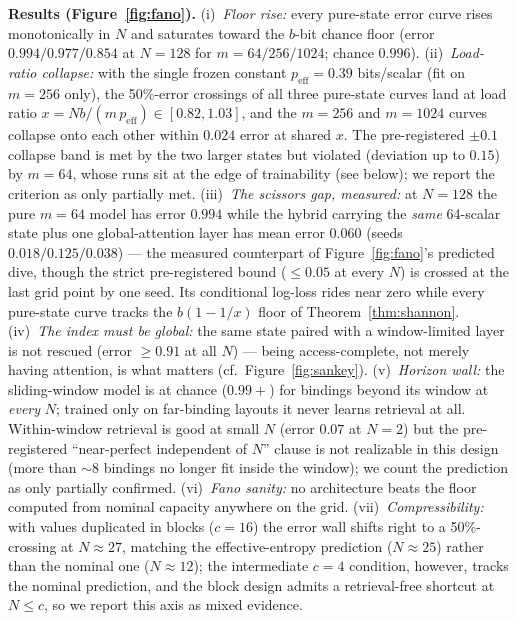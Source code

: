 \textbf{Results (Figure~\ref{fig:fano}).}
(i)~\emph{Floor rise:} every pure-state error curve rises monotonically in $N$
and saturates toward the $b$-bit chance floor (error $0.994/0.977/0.854$ at
$N{=}128$ for $m{=}64/256/1024$; chance $0.996$).
(ii)~\emph{Load-ratio collapse:} with the single frozen constant
$p_{\mathrm{eff}}{=}0.39$ bits/scalar (fit on $m{=}256$ only), the 50\%-error
crossings of all three pure-state curves land at load ratio
$x = Nb/(m\,p_{\mathrm{eff}}) \in [0.82, 1.03]$, and the $m{=}256$ and
$m{=}1024$ curves collapse onto each other within $0.024$ error at shared $x$.
The pre-registered $\pm 0.1$ collapse band is met by the two larger states but
violated (deviation up to $0.15$) by $m{=}64$, whose runs sit at the edge of
trainability (see below); we report the criterion as only partially met.
(iii)~\emph{The scissors gap, measured:} at $N{=}128$ the pure $m{=}64$ model
has error $0.994$ while the hybrid carrying the \emph{same} 64-scalar state
plus one global-attention layer has mean error $0.060$
(seeds $0.018/0.125/0.038$) --- the measured counterpart of
Figure~\ref{fig:fano}'s predicted dive, though the strict pre-registered bound
($\le 0.05$ at every $N$) is crossed at the last grid point by one seed.
Its conditional log-loss rides near zero while every pure-state curve tracks
the $b(1-1/x)$ floor of Theorem~\ref{thm:shannon}.
(iv)~\emph{The index must be global:} the same state paired with a
window-limited layer is not rescued (error $\ge 0.91$ at all $N$) --- being
access-complete, not merely having attention, is what matters
(cf.\ Figure~\ref{fig:sankey}).
(v)~\emph{Horizon wall:} the sliding-window model is at chance ($0.99+$) for
bindings beyond its window at \emph{every} $N$; trained only on far-binding
layouts it never learns retrieval at all. Within-window retrieval is good at
small $N$ (error $0.07$ at $N{=}2$) but the pre-registered
``near-perfect independent of $N$'' clause is not realizable in this design
(more than $\sim$8 bindings no longer fit inside the window); we count the
prediction as only partially confirmed.
(vi)~\emph{Fano sanity:} no architecture beats the floor computed from nominal
capacity anywhere on the grid.
(vii)~\emph{Compressibility:} with values duplicated in blocks ($c{=}16$) the
error wall shifts right to a 50\%-crossing at $N\!\approx\!27$, matching the
effective-entropy prediction ($N\!\approx\!25$) rather than the nominal one
($N\!\approx\!12$); the intermediate $c{=}4$ condition, however, tracks the
nominal prediction, and the block design admits a retrieval-free shortcut at
$N\le c$, so we report this axis as mixed evidence.
